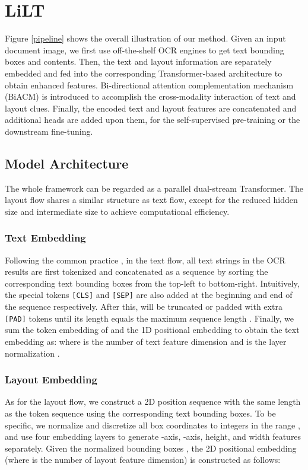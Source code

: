 \documentclass[11pt]{article}
\begin{document}
\section{LiLT}
Figure \ref{pipeline} shows the overall illustration of our method. Given an input  document image, we first use off-the-shelf OCR engines to get  text bounding boxes and  contents. Then, the text and layout information are separately embedded and fed into the corresponding Transformer-based architecture to obtain enhanced features. 
Bi-directional attention complementation mechanism (BiACM) is introduced to  accomplish the cross-modality interaction of text and layout clues.
Finally, the  encoded text and layout features are concatenated and additional heads are added upon them, for the self-supervised pre-training or the downstream fine-tuning.

\subsection{Model Architecture}
The whole framework can be regarded as a parallel dual-stream Transformer. The layout flow shares a similar structure as text flow, except for the reduced hidden size and intermediate size to achieve computational efficiency.

\subsubsection{Text  Embedding}
Following the common practice \cite{devlin2019bert,Layoutlm}, in the text flow, all text strings in the OCR results are first tokenized and concatenated as a sequence  by sorting the corresponding text bounding boxes from the top-left to bottom-right. Intuitively, the special tokens \texttt{[CLS]} and \texttt{[SEP]} are also added at the beginning and end of the sequence respectively.  After this,  will be truncated or padded with extra \texttt{[PAD]} tokens until its length equals  the maximum sequence length . Finally, we sum the  token embedding  of  and the 1D positional embedding  to obtain the text embedding   as:
where  is the number of text feature dimension and  is the layer normalization \cite{ln}.

\subsubsection{Layout  Embedding}
As for the layout flow, we construct a 2D position sequence  with the same length as the token sequence  using the corresponding text bounding boxes. To be specific,  we normalize and discretize all box coordinates to integers in  the range , and use four embedding layers to generate -axis, -axis, height, and width features separately. Given the normalized bounding boxes , the 2D positional embedding  (where  is the number of layout feature dimension) is  constructed  as follows:
\end{document}
